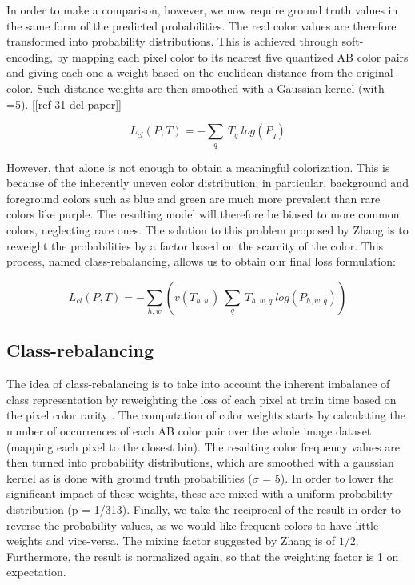 \documentclass[twoside,twocolumn]{article}
\begin{document}
In order to make a comparison, however, we now require ground truth values in the same form of the predicted probabilities. The real color values are therefore transformed into probability distributions. This is achieved through soft-encoding, by mapping each pixel color to its nearest five quantized AB color pairs and giving each one a weight based on the euclidean distance from the original color. Such distance-weights are then smoothed with a Gaussian kernel (with =5). [[ref 31 del paper]]

\begin{equation}
L_{cl}(P,T) = - \sum_{q} \: T_q \: log(P_q)
\end{equation}

However, that alone is not enough to obtain a meaningful colorization. This is because of the inherently uneven color distribution; in particular, background and foreground colors such as blue and green are much more prevalent than rare colors like purple. The resulting model will therefore be biased to more common colors, neglecting rare ones. 
The solution to this problem proposed by Zhang \cite{Zhang:2016} is to reweight the probabilities by a factor based on the scarcity of the color. This process, named class-rebalancing, allows us to obtain our final loss formulation:

\begin{equation}
L_{cl}(P,T) = - \sum_{h,w}(v(T_{h,w}) \: \sum_{q} \: T_{h,w,q} \: log(P_{h,w,q}))
\end{equation}

\subsection{Class-rebalancing}

The idea of class-rebalancing is to take into account the inherent imbalance of class representation by reweighting the loss of each pixel at train time based on the pixel color rarity \cite{Zhang:2016}. The computation of color weights starts by calculating the number of occurrences of each AB color pair over the whole image dataset (mapping each pixel to the closest bin). The resulting color frequency values are then turned into probability distributions, which are smoothed with a gaussian kernel as is done with ground truth probabilities ($\sigma$ = 5). In order to lower the significant impact of these weights, these are mixed with a uniform probability distribution (p = 1/313). Finally, we take the reciprocal of the result in order to reverse the probability values, as we would like frequent colors to have little weights and vice-versa. The mixing factor suggested by Zhang \cite{Zhang:2016} is of $1/2$. Furthermore, the result is normalized again, so that the weighting factor is 1 on expectation.
\end{document}
